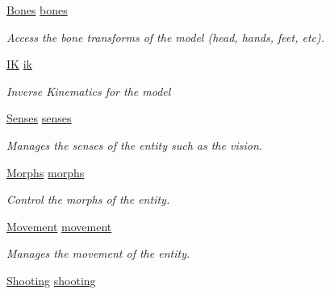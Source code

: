 \begin{DoxyCompactItemize}
\mbox{\hyperlink{class_lua_1_1_bones}{Bones}} \mbox{\hyperlink{class_lua_1_1_entity_a8d4bdecb96c327395e5ddbde88608cf4}{bones}}
\begin{DoxyCompactList}\small\item\em Access the bone transforms of the model (head, hands, feet, etc). \end{DoxyCompactList}\item 
\mbox{\hyperlink{class_lua_1_1_i_k}{IK}} \mbox{\hyperlink{class_lua_1_1_entity_a42cd1e5e507a1e79eb1161799564da88}{ik}}
\begin{DoxyCompactList}\small\item\em Inverse Kinematics for the model \end{DoxyCompactList}\item 
\mbox{\hyperlink{class_lua_1_1_senses}{Senses}} \mbox{\hyperlink{class_lua_1_1_entity_a9a5a67b2da9b9d95e31c766aa68760ee}{senses}}
\begin{DoxyCompactList}\small\item\em Manages the senses of the entity such as the vision. \end{DoxyCompactList}\item 
\mbox{\hyperlink{class_lua_1_1_morphs}{Morphs}} \mbox{\hyperlink{class_lua_1_1_entity_aa9723210eb2494461ff12c55b52e8844}{morphs}}
\begin{DoxyCompactList}\small\item\em Control the morphs of the entity. \end{DoxyCompactList}\item 
\mbox{\hyperlink{class_lua_1_1_movement}{Movement}} \mbox{\hyperlink{class_lua_1_1_entity_a2845d63d6164b33ee49f760211fa4116}{movement}}
\begin{DoxyCompactList}\small\item\em Manages the movement of the entity. \end{DoxyCompactList}\item 
\mbox{\hyperlink{class_lua_1_1_shooting}{Shooting}} \mbox{\hyperlink{class_lua_1_1_entity_af00214fc6ff19d22818d8d0810630cea}{shooting}}

\end{DoxyCompactItemize}
